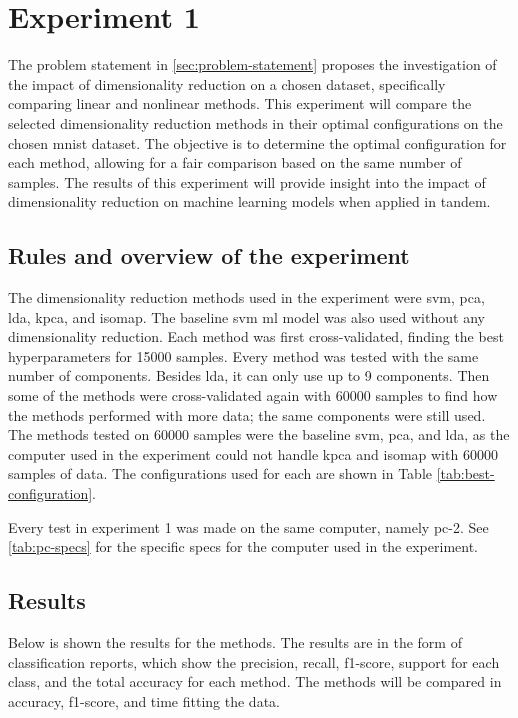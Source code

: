 \section{Experiment 1}\label{sec:experiment-1}
The problem statement in \autoref{sec:problem-statement} proposes the investigation of the impact of dimensionality reduction on a chosen dataset, specifically comparing linear and nonlinear methods. This experiment will compare the selected dimensionality reduction methods in their optimal configurations on the chosen \gls{mnist} dataset. The objective is to determine the optimal configuration for each method, allowing for a fair comparison based on the same number of samples. The results of this experiment will provide insight into the impact of dimensionality reduction on machine learning models when applied in tandem.

\subsection{Rules and overview of the experiment}\label{subsec:experiment-1-rules}
The dimensionality reduction methods used in the experiment were \gls{svm}, \gls{pca}, \gls{lda}, \gls{kpca}, and \gls{isomap}. The baseline \gls{svm} \gls{ml} model was also used without any dimensionality reduction. Each method was first cross-validated, finding the best hyperparameters for 15000 samples. Every method was tested with the same number of components. Besides \gls{lda}, it can only use up to 9 components. Then some of the methods were cross-validated again with 60000 samples to find how the methods performed with more data; the same components were still used. The methods tested on 60000 samples were the baseline \gls{svm}, \gls{pca}, and \gls{lda}, as the computer used in the experiment could not handle \gls{kpca} and \gls{isomap} with 60000 samples of data. The configurations used for each are shown in Table \ref{tab:best-configuration}.



Every test in experiment 1 was made on the same computer, namely pc-2. See \autoref{tab:pc-specs} for the specific specs for the computer used in the experiment.


\subsection{Results}\label{subsec:experiment-1-results}
Below is shown the results for the methods. The results are in the form of classification reports, which show the precision, recall, f1-score, support for each class, and the total accuracy for each method. The methods will be compared in accuracy, f1-score, and time fitting the data.

